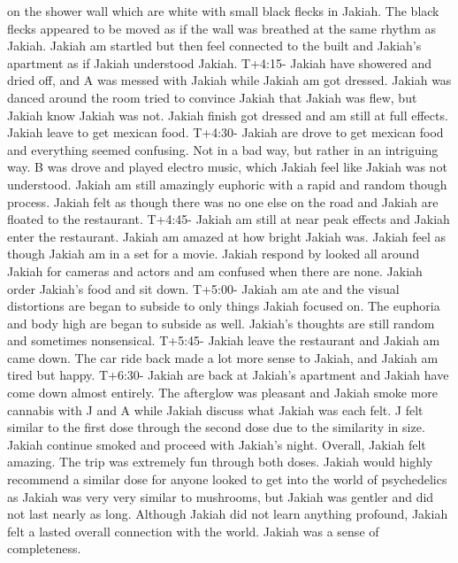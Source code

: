 \documentclass[12pt]{book}
\begin{document}
on the shower wall which are white with small black flecks in Jakiah. The black flecks appeared to be moved as if the wall was breathed at the same rhythm as Jakiah. Jakiah am startled but then feel connected to the built and Jakiah's apartment as if Jakiah understood Jakiah. T+4:15- Jakiah have showered and dried off, and A was messed with Jakiah while Jakiah am got dressed. Jakiah was danced around the room tried to convince Jakiah that Jakiah was flew, but Jakiah know Jakiah was not. Jakiah finish got dressed and am still at full effects. Jakiah leave to get mexican food. T+4:30- Jakiah are drove to get mexican food and everything seemed confusing. Not in a bad way, but rather in an intriguing way. B was drove and played electro music, which Jakiah feel like Jakiah was not understood. Jakiah am still amazingly euphoric with a rapid and random though process. Jakiah felt as though there was no one else on the road and Jakiah are floated to the restaurant. T+4:45- Jakiah am still at near peak effects and Jakiah enter the restaurant. Jakiah am amazed at how bright Jakiah was. Jakiah feel as though Jakiah am in a set for a movie. Jakiah respond by looked all around Jakiah for cameras and actors and am confused when there are none. Jakiah order Jakiah's food and sit down. T+5:00- Jakiah am ate and the visual distortions are began to subside to only things Jakiah focused on. The euphoria and body high are began to subside as well. Jakiah's thoughts are still random and sometimes nonsensical. T+5:45- Jakiah leave the restaurant and Jakiah am came down. The car ride back made a lot more sense to Jakiah, and Jakiah am tired but happy. T+6:30- Jakiah are back at Jakiah's apartment and Jakiah have come down almost entirely. The afterglow was pleasant and Jakiah smoke more cannabis with J and A while Jakiah discuss what Jakiah was each felt. J felt similar to the first dose through the second dose due to the similarity in size. Jakiah continue smoked and proceed with Jakiah's night. Overall, Jakiah felt amazing. The trip was extremely fun through both doses. Jakiah would highly recommend a similar dose for anyone looked to get into the world of psychedelics as Jakiah was very very similar to mushrooms, but Jakiah was gentler and did not last nearly as long. Although Jakiah did not learn anything profound, Jakiah felt a lasted overall connection with the world. Jakiah was a sense of completeness.
\end{document}
